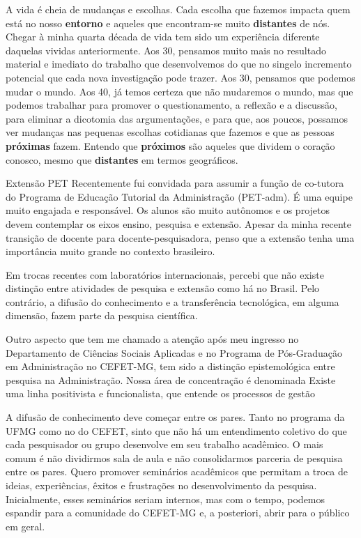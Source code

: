 \documentclass[
]{book}
\begin{document}
A vida é cheia de mudanças e escolhas. Cada escolha que fazemos impacta
quem está no nosso \textbf{entorno} e aqueles que encontram-se muito
\textbf{distantes} de nós. Chegar à minha quarta década de vida tem sido
um experiência diferente daquelas vividas anteriormente. Aos 30,
pensamos muito mais no resultado material e imediato do trabalho que
desenvolvemos do que no singelo incremento potencial que cada nova
investigação pode trazer. Aos 30, pensamos que podemos mudar o mundo.
Aos 40, já temos certeza que não mudaremos o mundo, mas que podemos
trabalhar para promover o questionamento, a reflexão e a discussão, para
eliminar a dicotomia das argumentações, e para que, aos poucos, possamos
ver mudanças nas pequenas escolhas cotidianas que fazemos e que as
pessoas \textbf{próximas} fazem. Entendo que \textbf{próximos} são
aqueles que dividem o coração conosco, mesmo que \textbf{distantes} em
termos geográficos.

Extensão PET Recentemente fui convidada para assumir a função de
co-tutora do Programa de Educação Tutorial da Administração (PET-adm). É
uma equipe muito engajada e responsável. Os alunos são muito autônomos e
os projetos devem contemplar os eixos ensino, pesquisa e extensão.
Apesar da minha recente transição de docente para docente-pesquisadora,
penso que a extensão tenha uma importância muito grande no contexto
brasileiro.

Em trocas recentes com laboratórios internacionais, percebi que não
existe distinção entre atividades de pesquisa e extensão como há no
Brasil. Pelo contrário, a difusão do conhecimento e a transferência
tecnológica, em alguma dimensão, fazem parte da pesquisa científica.

Outro aspecto que tem me chamado a atenção após meu ingresso no
Departamento de Ciências Sociais Aplicadas e no Programa de
Pós-Graduação em Administração no CEFET-MG, tem sido a distinção
epistemológica entre pesquisa na Administração. Nossa área de
concentração é denominada Existe uma linha positivista e funcionalista,
que entende os processos de gestão

A difusão de conhecimento deve começar entre os pares. Tanto no programa
da UFMG como no do CEFET, sinto que não há um entendimento coletivo do
que cada pesquisador ou grupo desenvolve em seu trabalho acadêmico. O
mais comum é não dividirmos sala de aula e não consolidarmos parceria de
pesquisa entre os pares. Quero promover seminários acadêmicos que
permitam a troca de ideias, experiências, êxitos e frustrações no
desenvolvimento da pesquisa. Inicialmente, esses seminários seriam
internos, mas com o tempo, podemos espandir para a comunidade do
CEFET-MG e, a posteriori, abrir para o público em geral.
\end{document}
